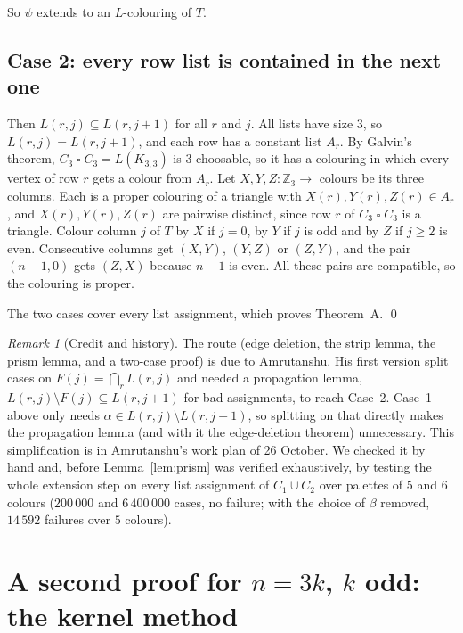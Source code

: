 \documentclass[11pt]{article}
\theoremstyle{plain}
\theoremstyle{definition}
\theoremstyle{remark}
\newtheorem{remark}[theorem]{Remark}
\newcommand{\T}{\mathbin{\square}}
\newcommand{\Z}{\mathbb{Z}}
\begin{document}
So $\psi$ extends to an $L$-colouring of $T$.

\subsection*{Case 2: every row list is contained in the next one}

Then $L(r, j) \subseteq L(r, j+1)$ for all $r$ and $j$. All lists have size $3$, so $L(r, j) =
L(r, j+1)$, and each row has a constant list $A_r$. By Galvin's theorem, $C_3 \T C_3 =
L(K_{3,3})$ is 3-choosable, so it has a colouring in which every vertex of row $r$ gets a colour
from $A_r$. Let $X, Y, Z : \Z_3 \to$ colours be its three columns. Each is a proper colouring of a
triangle with $X(r), Y(r), Z(r) \in A_r$, and $X(r), Y(r), Z(r)$ are pairwise distinct, since row
$r$ of $C_3 \T C_3$ is a triangle. Colour column $j$ of $T$ by $X$ if $j = 0$, by $Y$ if $j$ is
odd and by $Z$ if $j \ge 2$ is even. Consecutive columns get $(X, Y)$, $(Y, Z)$ or $(Z, Y)$, and
the pair $(n-1, 0)$ gets $(Z, X)$ because $n - 1$ is even. All these pairs are compatible, so the
colouring is proper.

The two cases cover every list assignment, which proves Theorem~A. \qed

\begin{remark}[Credit and history]
The route (edge deletion, the strip lemma, the prism lemma, and a two-case proof) is due to
Amrutanshu. His first version split cases on $F(j) = \bigcap_r L(r, j)$ and needed a
propagation lemma, $L(r, j) \setminus F(j) \subseteq L(r, j+1)$ for bad assignments, to reach
Case~2. Case~1 above only needs $\alpha \in L(r, j) \setminus L(r, j+1)$, so splitting on that
directly makes the propagation lemma (and with it the edge-deletion theorem) unnecessary. This
simplification is in Amrutanshu's work plan of 26 October. We checked it by hand and, before
Lemma~\ref{lem:prism} was verified exhaustively, by testing the whole extension step on every
list assignment of $C_1 \cup C_2$ over palettes of $5$ and $6$ colours ($200\,000$ and
$6\,400\,000$ cases, no failure; with the choice of $\beta$ removed, $14\,592$ failures over $5$
colours).
\end{remark}

\section{A second proof for $n = 3k$, $k$ odd: the kernel method}\label{sec:kernel}
\end{document}
